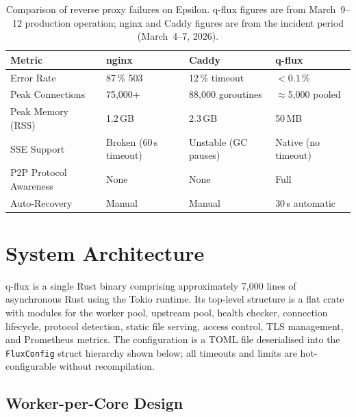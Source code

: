 \documentclass[a4paper, 11pt]{article}
\begin{document}
\begin{table}[t]
\centering
\caption{Comparison of reverse proxy failures on Epsilon. q-flux figures are
from March~9--12 production operation; nginx and Caddy figures are from the
incident period (March~4--7, 2026).}
\label{tab:nginx-caddy}
\begin{tabular}{llll}
\toprule
\textbf{Metric}         & \textbf{nginx}             & \textbf{Caddy}             & \textbf{q-flux} \\
\midrule
Error Rate              & 87\,\% 503                 & 12\,\% timeout             & $<0.1\,\%$ \\
Peak Connections        & 75{,}000+                  & 88{,}000 goroutines        & $\approx$5{,}000 pooled \\
Peak Memory (RSS)       & 1.2\,GB                    & 2.3\,GB                    & 50\,MB \\
SSE Support             & Broken (60\,s timeout)     & Unstable (GC pauses)       & Native (no timeout) \\
P2P Protocol Awareness  & None                       & None                       & Full \\
Auto-Recovery           & Manual                     & Manual                     & 30\,s automatic \\
\bottomrule
\end{tabular}
\end{table}

\section{System Architecture}
\label{sec:arch}

q-flux is a single Rust binary comprising approximately 7{,}000 lines of
asynchronous Rust using the Tokio runtime.  Its top-level structure is a
flat crate with modules for the worker pool, upstream pool, health checker,
connection lifecycle, protocol detection, static file serving, access control,
TLS management, and Prometheus metrics.  The configuration is a TOML file
deserialised into the \texttt{FluxConfig} struct hierarchy shown below; all
timeouts and limits are hot-configurable without recompilation.

\subsection{Worker-per-Core Design}
\label{sec:worker}
\end{document}
